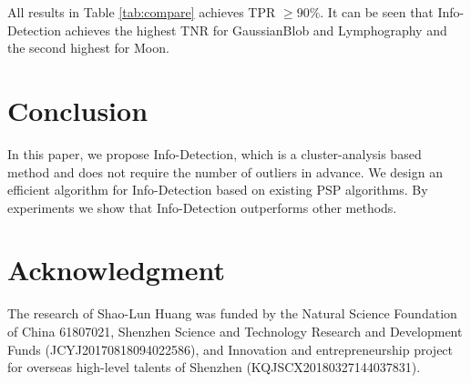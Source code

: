 \documentclass[runningheads]{llncs}
\begin{document}
All results in Table \ref{tab:compare} achieves TPR $\geq 90\%$. It can be seen that Info-Detection achieves the highest TNR for GaussianBlob and Lymphography and the second highest for Moon.

\section{Conclusion}\label{sec:Conclusion}
In this paper, we propose Info-Detection, which is a cluster-analysis based method and does not require the number of outliers in advance. We design an efficient algorithm for Info-Detection based on existing PSP algorithms. By experiments we show that Info-Detection outperforms other methods.  
\section*{Acknowledgment}

The research of Shao-Lun Huang was funded by the Natural Science Foundation of China 61807021, Shenzhen Science and Technology Research and Development Funds (JCYJ20170818094022586), and Innovation and entrepreneurship project for overseas high-level talents of Shenzhen (KQJSCX20180327144037831).
%
%
%


%
\end{document}
